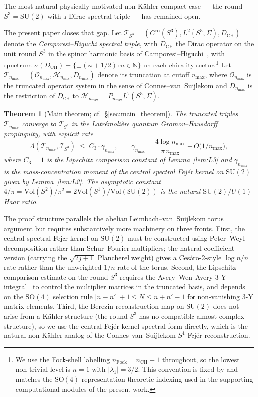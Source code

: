 \documentclass[11pt,a4paper]{article}
\theoremstyle{plain}
\newtheorem{theorem}{Theorem}[section]
\theoremstyle{definition}
\newcommand{\nmax}{n_{\max}}
\newcommand{\sthree}{S^{3}}
\newcommand{\Hilb}{\mathcal{H}}
\newcommand{\Op}{\mathcal{O}}
\newcommand{\Tcal}{\mathcal{T}}
\newcommand{\N}{\mathbb{N}}
\newcommand{\SU}{\mathrm{SU}}
\newcommand{\SO}{\mathrm{SO}}
\newcommand{\Vol}{\mathrm{Vol}}
\newcommand{\DCH}{D_{\mathrm{CH}}}
\begin{document}
The most natural physically motivated non-K\"ahler compact case ---
the round $\sthree = \SU(2)$ with a Dirac spectral triple --- has
remained open.

The present paper closes that gap. Let $\Tcal_{\sthree} =
(C^\infty(\sthree), L^2(\sthree, \Sigma), \DCH)$ denote the
\emph{Camporesi--Higuchi spectral triple}, with $\DCH$ the Dirac
operator on the unit round $\sthree$ in the spinor harmonic basis
of Camporesi--Higuchi~\cite{camporesi_higuchi1996}, with spectrum
$\sigma(\DCH) = \{\pm(n + 1/2) : n \in \N\}$ on each chirality
sector.\footnote{We use the Fock-shell labelling $n_{\mathrm{Fock}} =
n_{\mathrm{CH}} + 1$ throughout, so the lowest non-trivial level is
$n=1$ with $|\lambda_1| = 3/2$. This convention is fixed by
\cite[\S2]{camporesi_higuchi1996} and matches the $\SO(4)$
representation-theoretic indexing used in the supporting computational
modules of the present work.} Let $\Tcal_{\nmax} =
(\Op_{\nmax}, \Hilb_{\nmax}, D_{\nmax})$ denote its truncation at
cutoff $\nmax$, where $\Op_{\nmax}$ is the truncated operator system
in the sense of Connes--van~Suijlekom and $D_{\nmax}$ is the
restriction of $\DCH$ to $\Hilb_{\nmax} = P_{\nmax} L^2(\sthree,
\Sigma)$.

\begin{theorem}[Main theorem; cf.~\S\ref{sec:main_theorem}]
\label{thm:main_intro}
The truncated triples $\Tcal_{\nmax}$ converge to $\Tcal_{\sthree}$ in
the Latr\'emoli\`ere quantum Gromov--Hausdorff propinquity, with
explicit rate
\begin{equation}\label{eq:main_rate}
   \Lambda(\Tcal_{\nmax}, \Tcal_{\sthree})
   \;\le\; C_3 \cdot \gamma_{\nmax}, \qquad
   \gamma_{\nmax} = \frac{4 \log \nmax}{\pi\,\nmax} + O\!\bigl(1/\nmax\bigr),
\end{equation}
where $C_3 = 1$ is the Lipschitz comparison constant of
Lemma~\ref{lem:L3} and $\gamma_{\nmax}$ is the mass-concentration
moment of the central spectral Fej\'er kernel on $\SU(2)$ given by
Lemma~\ref{lem:L2}. The asymptotic constant
$4/\pi = \Vol(S^2)/\pi^2 = 2\Vol(S^1)/\Vol(\SU(2))$ is the natural
$\SU(2)/U(1)$ Haar ratio.
\end{theorem}

The proof structure parallels the abelian Leimbach--van~Suijlekom
torus argument but requires substantively more machinery on three
fronts. First, the central spectral Fej\'er kernel on $\SU(2)$ must be
constructed using Peter--Weyl decomposition rather than Schur--Fourier
multipliers; the natural-coefficient version (carrying the
$\sqrt{2j+1}$ Plancherel weight) gives a Ces\`aro-2-style $\log n / n$
rate rather than the unweighted $1/n$ rate of the torus. Second, the
Lipschitz comparison estimate on the round $\sthree$ requires the
Avery--Wen--Avery 3-Y integral~\cite{avery_wen_avery1986, paper7} to
control the multiplier matrices in the truncated basis, and depends on
the $\SO(4)$ selection rule
$|n - n'| + 1 \le N \le n + n' - 1$ for non-vanishing 3-Y matrix
elements. Third, the Berezin reconstruction map on $\SU(2)$ does not
arise from a K\"ahler structure (the round $\sthree$ has no compatible
almost-complex structure), so we use the central-Fej\'er-kernel
spectral form directly, which is the natural non-K\"ahler analog of
the Connes--van~Suijlekom $S^1$ Fej\'er reconstruction.
\end{document}
